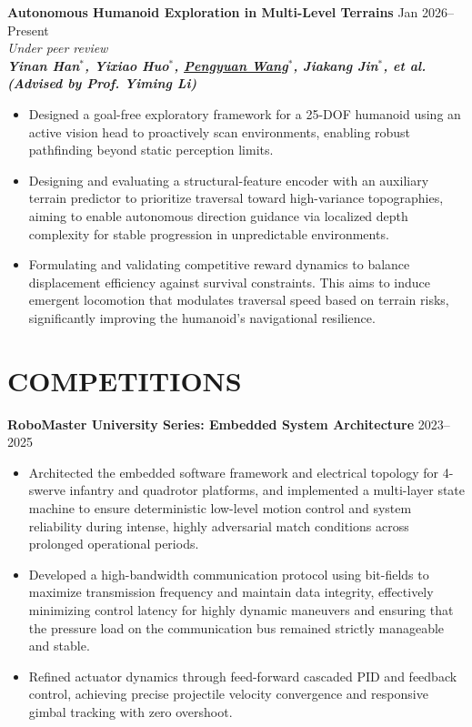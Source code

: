 \documentclass[a4paper,11pt]{article}
\begin{document}
\textcolor{titleblue}{\textbf{Autonomous Humanoid Exploration in Multi-Level Terrains}} \hfill Jan 2026--Present \\
\textit{Under peer review} \\
\textit{\textbf{Yinan Han$^*$, Yixiao Huo$^*$, \underline{Pengyuan Wang$^*$}, Jiakang Jin$^*$, et al. (Advised by Prof. Yiming Li)}}
\begin{itemize}[nosep,after=\strut, leftmargin=1.5em, itemsep=3pt,label=$\bullet$]
\item Designed a goal-free exploratory framework for a 25-DOF humanoid using an active vision head to proactively scan environments, enabling robust pathfinding beyond static perception limits.
\item Designing and evaluating a structural-feature encoder with an auxiliary terrain predictor to prioritize traversal toward high-variance topographies, aiming to enable autonomous direction guidance via localized depth complexity for stable progression in unpredictable environments.
\item Formulating and validating competitive reward dynamics to balance displacement efficiency against survival constraints. This aims to induce emergent locomotion that modulates traversal speed based on terrain risks, significantly improving the humanoid's navigational resilience.
\end{itemize}

\vspace{6pt}

\section{COMPETITIONS}

\textcolor{titleblue}{\textbf{RoboMaster University Series: Embedded System Architecture}} \hfill 2023--2025
\begin{itemize}[nosep,after=\strut, leftmargin=1.5em, itemsep=3pt,label=$\bullet$]
\item Architected the embedded software framework and electrical topology for 4-swerve infantry and quadrotor platforms, and implemented a multi-layer state machine to ensure deterministic low-level motion control and system reliability during intense, highly adversarial match conditions across prolonged operational periods.
\item Developed a high-bandwidth communication protocol using bit-fields to maximize transmission frequency and maintain data integrity, effectively minimizing control latency for highly dynamic maneuvers and ensuring that the pressure load on the communication bus remained strictly manageable and stable.
\item Refined actuator dynamics through feed-forward cascaded PID and feedback control, achieving precise projectile velocity convergence and responsive gimbal tracking with zero overshoot.
\end{itemize}
\end{document}
